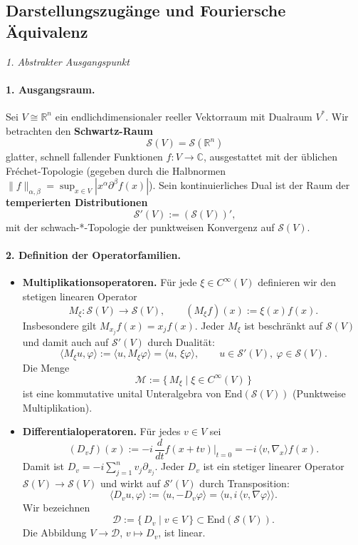 \documentclass[10pt, letterpaper]{article}
\newcommand{\R}{\mathbb{R}}
\newcommand{\C}{\mathbb{C}}
\newcommand{\End}{\mathrm{End}}
\begin{document}

\subsection{Darstellungszugänge und Fouriersche Äquivalenz}

\emph{1. Abstrakter Ausgangspunkt}


\paragraph{1. Ausgangsraum.}
Sei $V\cong\R^n$ ein endlichdimensionaler reeller Vektorraum mit Dualraum $V^\ast$.
Wir betrachten den \textbf{Schwartz-Raum}
\[
\mathcal{S}(V)=\mathcal{S}(\R^n)
\]
glatter, schnell fallender Funktionen $f:V\to\C$, ausgestattet mit der üblichen
Fréchet-Topologie (gegeben durch die Halbnormen
$\|f\|_{\alpha,\beta}=\sup_{x\in V}|x^\alpha\partial^\beta f(x)|$).
Sein kontinuierliches Dual ist der Raum der \textbf{temperierten Distributionen}
\[
\mathcal{S}'(V):=(\mathcal{S}(V))',
\]
mit der schwach-*-Topologie der punktweisen Konvergenz auf $\mathcal{S}(V)$.



\paragraph{2. Definition der Operatorfamilien.}

\begin{itemize}
\item \textbf{Multiplikationsoperatoren.}
Für jede $\xi\in C^\infty(V)$ definieren wir den stetigen linearen Operator
\[
M_\xi:\mathcal{S}(V)\to\mathcal{S}(V),\qquad
(M_\xi f)(x):=\xi(x)f(x).
\]
Insbesondere gilt $M_{x_j}f(x)=x_j f(x)$.
Jeder $M_\xi$ ist beschränkt auf $\mathcal{S}(V)$ und damit auch auf $\mathcal{S}'(V)$
durch Dualität:
\[
\langle M_\xi u,\varphi\rangle:=\langle u, M_\xi\varphi\rangle
=\langle u,\,\xi\varphi\rangle,\qquad u\in\mathcal{S}'(V),\ \varphi\in\mathcal{S}(V).
\]
Die Menge
\[
\mathcal{M}:=\{\,M_\xi\mid\xi\in C^\infty(V)\,\}
\]
ist eine kommutative unital Unteralgebra von $\End(\mathcal{S}(V))$ (Punktweise Multiplikation).

\item \textbf{Differentialoperatoren.}
Für jedes $v\in V$ sei
\[
(D_v f)(x):=-i\,\frac{d}{dt}f(x+tv)\big|_{t=0}
=-i\,\langle v,\nabla_x\rangle f(x).
\]
Damit ist $D_v=-i\sum_{j=1}^n v_j\partial_{x_j}$.
Jeder $D_v$ ist ein stetiger linearer Operator $\mathcal{S}(V)\to\mathcal{S}(V)$
und wirkt auf $\mathcal{S}'(V)$ durch Transposition:
\[
\langle D_v u,\varphi\rangle
:=\langle u,-D_v\varphi\rangle
=\langle u,i\,\langle v,\nabla\varphi\rangle\rangle.
\]
Wir bezeichnen
\[
\mathcal{D}:=\{\,D_v\mid v\in V\,\}\subset \End(\mathcal{S}(V)).
\]
Die Abbildung $V\to\mathcal{D}$, $v\mapsto D_v$, ist linear.
\end{itemize}
\end{document}
